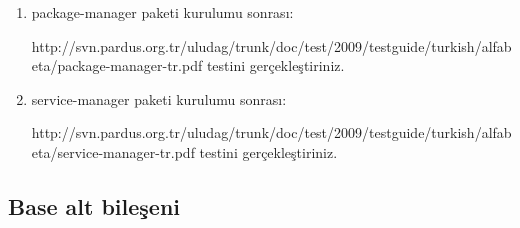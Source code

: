 \documentclass[a4paper,10pt]{article}
\begin{document}
\begin{enumerate}
\item package-manager paketi kurulumu sonrası:

http://svn.pardus.org.tr/uludag/trunk/doc/test/2009/testguide/turkish/alfabeta/package-manager-tr.pdf  testini gerçekleştiriniz.

\item service-manager paketi kurulumu sonrası:

http://svn.pardus.org.tr/uludag/trunk/doc/test/2009/testguide/turkish/alfabeta/service-manager-tr.pdf  testini gerçekleştiriniz.

\end{enumerate}

\subsection*{Base alt bileşeni}
\end{document}
